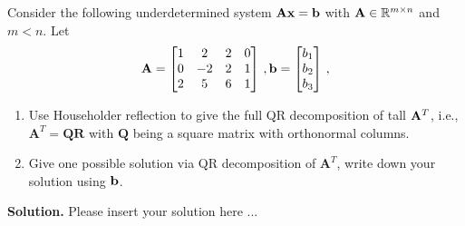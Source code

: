 \documentclass[english,onecolumn]{IEEEtran}
\def\Q{\mathbf{Q}}
\def\A{\mathbf{A}}
\def\R{\mathbf{R}}
\begin{document}
Consider the following underdetermined system ${\bf Ax}={\bf b}$ with ${\bf A}\in \mathbb{R}^{m\times n}$ and $m<n$. Let 
    \[
    {\bf A}=
    \begin{bmatrix}
         1&2&2&0\\
         0&-2&2&1\\
         2&5&6&1
    \end{bmatrix}\,,
    {\bf b}=
    \begin{bmatrix}
        b_1\\b_2\\b_3
    \end{bmatrix}\,,
    \]
\begin{enumerate}
    \item Use Householder reflection to give the full QR decomposition of tall ${\bf A}^T$, i.e., $\A^T= \Q\R$ with $\Q$ being a square matrix with orthonormal columns.
    \item Give one possible solution via QR decomposition of $\A^T$, write down your solution using $\bf{b}$.
\end{enumerate}
\noindent
\textbf{Solution.}
Please insert your solution here ...
\end{document}
